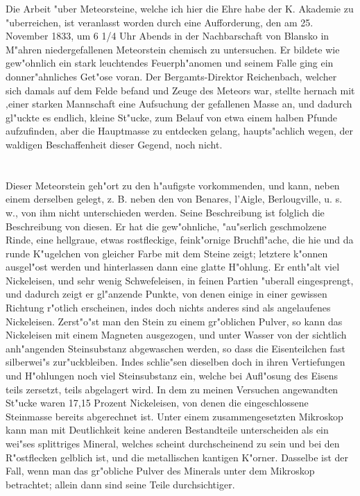 \documentclass[a4paper, 11pt, oneside]{article}
\begin{document}
Die Arbeit "uber Meteorsteine, welche ich hier die Ehre habe der K. Akademie zu "uberreichen, ist veranlasst worden durch eine Aufforderung, den am 25. November 1833, um 6 1/4 Uhr Abends in der Nachbarschaft von Blansko in M"ahren niedergefallenen Meteorstein chemisch zu untersuchen. Er bildete wie gew"ohnlich ein stark leuchtendes Feuerph"anomen und seinem Falle ging ein donner"ahnliches Get"ose voran. Der Bergamts-Direktor Reichenbach, welcher sich damals auf dem Felde befand und Zeuge des Meteors war, stellte hernach mit ‚einer starken Mannschaft eine Aufsuchung der gefallenen Masse an, und dadurch gl"uckte es endlich, kleine St"ucke, zum Belauf von etwa einem halben Pfunde aufzufinden, aber die Hauptmasse zu entdecken gelang, haupts"achlich wegen, der waldigen Beschaffenheit dieser Gegend, noch nicht.

\section{}
\paragraph{}
Dieser Meteorstein geh"ort zu den h"aufigste vorkommenden, und kann, neben einem derselben gelegt, z. B. neben den von Benares, l’Aigle, Berlougville, u. s. w., von ihm nicht unterschieden werden. Seine Beschreibung ist folglich die Beschreibung von diesen. Er hat die gew"ohnliche, "au"serlich geschmolzene Rinde, eine hellgraue, etwas rostfleckige, feink"ornige Bruchfl"ache, die hie und da runde K"ugelchen von gleicher Farbe mit dem Steine zeigt; letztere k"onnen ausgel"ost werden und hinterlassen dann eine glatte H"ohlung. Er enth"alt viel Nickeleisen, und sehr wenig Schwefeleisen, in feinen Partien "uberall eingesprengt, und dadurch zeigt er gl"anzende Punkte, von denen einige in einer gewissen Richtung r"otlich erscheinen, indes doch nichts anderes sind als angelaufenes Nickeleisen. Zerst"o"st man den Stein zu einem gr"oblichen Pulver, so kann das Nickeleisen mit einem Magneten ausgezogen, und unter Wasser von der sichtlich anh"angenden Steinsubstanz abgewaschen werden, so dass die Eisenteilchen fast silberwei"s zur"uckbleiben. Indes schlie"sen dieselben doch in ihren Vertiefungen und H"ohlungen noch viel Steinsubstanz ein, welche bei Aufl"osung des Eisens teils zersetzt, teils abgelagert wird. In dem zu meinen Versuchen angewandten St"ucke waren 17,15 Prozent Nickeleisen, von denen die eingeschlossene Steinmasse bereits abgerechnet ist. Unter einem zusammengesetzten Mikroskop kann man mit Deutlichkeit keine anderen Bestandteile unterscheiden als ein wei"ses splittriges Mineral, welches scheint durchscheinend zu sein und bei den R"ostflecken gelblich ist, und die metallischen kantigen K"orner. Dasselbe ist der Fall, wenn man das gr"obliche Pulver des Minerals unter dem Mikroskop betrachtet; allein dann sind seine Teile durchsichtiger.
\end{document}

